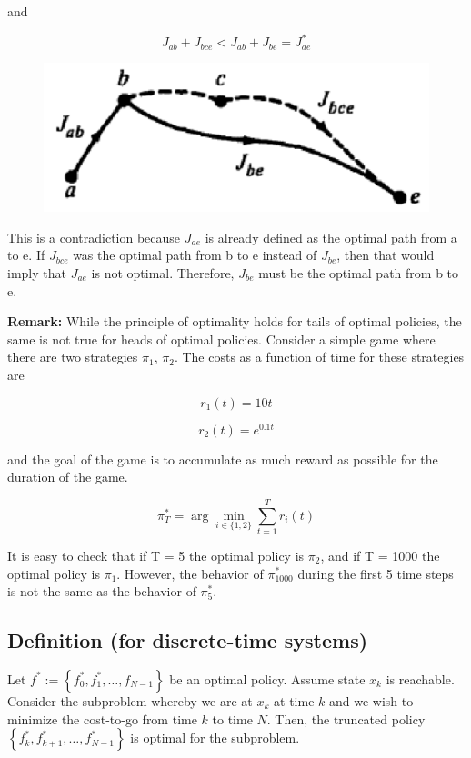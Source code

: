 \documentclass[twoside]{article}
\begin{document}
and

\begin{equation*}
    J_{ab} + J_{bce} < J_{ab} + J_{be} = J_{ae}^*
\end{equation*}

\begin{figure}[!htb]
  \centering
  \includegraphics[scale=0.6]{path1.PNG}
\end{figure}

This is a contradiction because $J_{ae}$ is already defined as the optimal path from a to e. If $J_{bce}$ was the optimal path from b to e instead of $J_{be}$, then that would imply that $J_{ae}$ is not optimal. Therefore, $J_{be}$ must be the optimal path from b to e.

\textbf{Remark:} While the principle of optimality holds for tails of optimal policies, the same is not true for heads of optimal policies. Consider a simple game where there are two strategies $\pi_1$, $\pi_2$. The costs as a function of time for these strategies are

\begin{equation*}
    r_1(t) = 10t
\end{equation*}

\begin{equation*}
    r_2(t) = e^{0.1t}
\end{equation*}

and the goal of the game is to accumulate as much reward as possible for the duration of the game.

$$ \pi_{T}^{*}=\arg \min _{i \in\{1,2\}} \sum_{t=1}^{T} r_{i}(t) $$

It is easy to check that if T = 5 the optimal policy is $\pi_2$, and if T = 1000 the optimal policy is $\pi_1$. However, the behavior of $\pi_{1000}^*$ during the first 5 time steps is not the same as the behavior of $\pi_{5}^*$.

\subsection{Definition (for discrete-time systems)}
Let $f^{*} :=\left\{f_{0}^{*}, f_{1}^{*}, \ldots, f_{N-1}\right\}$ be an optimal policy. Assume state $x_k$ is reachable. Consider the subproblem whereby we are at $x_k$ at time $k$ and we wish to minimize the cost-to-go from time $k$ to time $N$. Then, the truncated policy $\left\{f_{k}^{*}, f_{k+1}^{*}, \dots, f_{N-1}^{*}\right\}$ is optimal for the subproblem.
\end{document}
